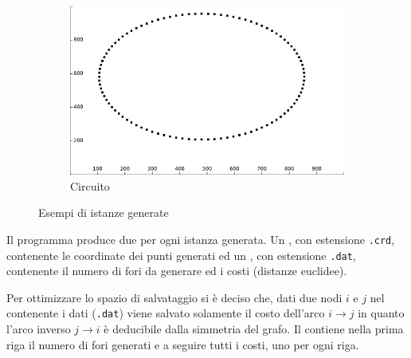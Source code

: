 \begin{figure}
\begin{subfigure}[b]{0.5\textwidth}
\includegraphics[width=\textwidth]{Images/Part_1/Instances/Circle.png}
\caption{Circuito}
\label{pt1:generator:Circle_img}
\end{subfigure}
\caption{Esempi di istanze generate}
\label{pt1:generator:imgs}
\end{figure}

Il programma produce due  per ogni istanza generata. Un , con estensione \texttt{.crd}, contenente le coordinate dei punti generati ed un , con estensione \texttt{.dat}, contenente il numero di fori da generare ed i costi (distanze euclidee).

Per ottimizzare lo spazio di salvataggio si è deciso che, dati due nodi $i$ e $j$ nel  contenente i dati (\texttt{.dat}) viene salvato solamente il costo dell'arco $i \rightarrow j$ in quanto l'arco inverso $j \rightarrow i$ è deducibile dalla simmetria del grafo. Il  contiene nella prima riga il numero di fori generati e a seguire tutti i costi, uno per ogni riga.